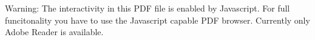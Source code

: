 Warning: The interactivity in this PDF file is enabled by Javascript. For
full funcitonality you have to use the Javascript capable PDF browser.
Currently only Adobe Reader is available.
